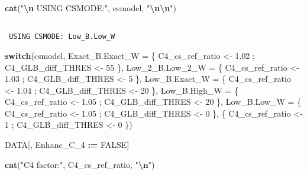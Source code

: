 \documentclass[
  10pt,
  a4paper,oneside]{article}
\newenvironment{Shaded}{\begin{snugshade}}{\end{snugshade}}
\newcommand{\AttributeTok}[1]{\textcolor[rgb]{0.13,0.29,0.53}{#1}}
\newcommand{\ConstantTok}[1]{\textcolor[rgb]{0.56,0.35,0.01}{#1}}
\newcommand{\ControlFlowTok}[1]{\textcolor[rgb]{0.13,0.29,0.53}{\textbf{#1}}}
\newcommand{\DecValTok}[1]{\textcolor[rgb]{0.00,0.00,0.81}{#1}}
\newcommand{\FloatTok}[1]{\textcolor[rgb]{0.00,0.00,0.81}{#1}}
\newcommand{\FunctionTok}[1]{\textcolor[rgb]{0.13,0.29,0.53}{\textbf{#1}}}
\newcommand{\NormalTok}[1]{#1}
\newcommand{\OtherTok}[1]{\textcolor[rgb]{0.56,0.35,0.01}{#1}}
\newcommand{\SpecialCharTok}[1]{\textcolor[rgb]{0.81,0.36,0.00}{\textbf{#1}}}
\newcommand{\StringTok}[1]{\textcolor[rgb]{0.31,0.60,0.02}{#1}}
\begin{document}
\begin{Shaded}
\begin{Highlighting}[]
\FunctionTok{cat}\NormalTok{(}\StringTok{"}\SpecialCharTok{\textbackslash{}n}\StringTok{ USING CSMODE:"}\NormalTok{, csmodel, }\StringTok{"}\SpecialCharTok{\textbackslash{}n\textbackslash{}n}\StringTok{"}\NormalTok{)}
\end{Highlighting}
\end{Shaded}

\begin{verbatim}

 USING CSMODE: Low_B.Low_W 
\end{verbatim}

\begin{Shaded}
\begin{Highlighting}[]
\ControlFlowTok{switch}\NormalTok{(csmodel,}
       \AttributeTok{Exact\_B.Exact\_W =}\NormalTok{ \{ C4\_cs\_ref\_ratio }\OtherTok{\textless{}{-}} \FloatTok{1.02}\NormalTok{ ; C4\_GLB\_diff\_THRES }\OtherTok{\textless{}{-}} \DecValTok{55}\NormalTok{ \},}
       \AttributeTok{Low\_2\_B.Low\_2\_W =}\NormalTok{ \{ C4\_cs\_ref\_ratio }\OtherTok{\textless{}{-}} \FloatTok{1.03}\NormalTok{ ; C4\_GLB\_diff\_THRES }\OtherTok{\textless{}{-}}  \DecValTok{5}\NormalTok{ \},}
       \AttributeTok{Low\_B.Exact\_W   =}\NormalTok{ \{ C4\_cs\_ref\_ratio }\OtherTok{\textless{}{-}} \FloatTok{1.04}\NormalTok{ ; C4\_GLB\_diff\_THRES }\OtherTok{\textless{}{-}} \DecValTok{20}\NormalTok{ \},}
       \AttributeTok{Low\_B.High\_W    =}\NormalTok{ \{ C4\_cs\_ref\_ratio }\OtherTok{\textless{}{-}} \FloatTok{1.05}\NormalTok{ ; C4\_GLB\_diff\_THRES }\OtherTok{\textless{}{-}} \DecValTok{20}\NormalTok{ \},}
       \AttributeTok{Low\_B.Low\_W     =}\NormalTok{ \{ C4\_cs\_ref\_ratio }\OtherTok{\textless{}{-}} \FloatTok{1.05}\NormalTok{ ; C4\_GLB\_diff\_THRES }\OtherTok{\textless{}{-}}  \DecValTok{0}\NormalTok{ \},}
\NormalTok{                         \{ C4\_cs\_ref\_ratio }\OtherTok{\textless{}{-}} \DecValTok{1}\NormalTok{    ; C4\_GLB\_diff\_THRES }\OtherTok{\textless{}{-}}  \DecValTok{0}\NormalTok{ \})}

\NormalTok{DATA[, Enhanc\_C\_4 }\SpecialCharTok{:=} \ConstantTok{FALSE}\NormalTok{]}


\FunctionTok{cat}\NormalTok{(}\StringTok{"C4 factor:"}\NormalTok{, C4\_cs\_ref\_ratio,   }\StringTok{"}\SpecialCharTok{\textbackslash{}n}\StringTok{"}\NormalTok{)}
\end{Highlighting}
\end{Shaded}
\end{document}
